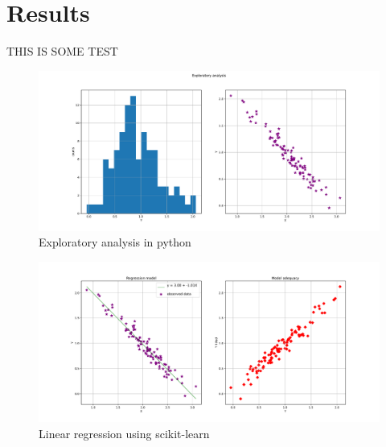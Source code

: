 \section{Results}

THIS IS SOME TEST

\begin{figure}
\centering
\includegraphics[width=\textwidth]{figures/fig_exploratory_analysis.pdf}
\caption{Exploratory analysis in python}
\label{fig:exploratory_analysis}
\end{figure}

\begin{figure}
\centering
\includegraphics[width=\textwidth]{figures/fig_linear_regression.pdf}
\caption{Linear regression using scikit-learn}
\label{fig:linear_regression}
\end{figure}
